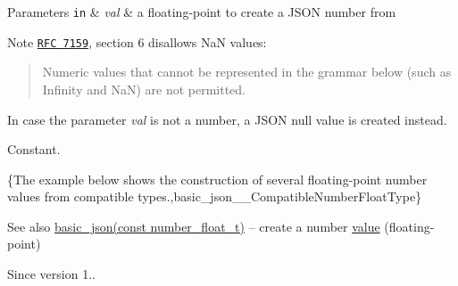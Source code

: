 \begin{DoxyParams}[1]{Parameters}
\mbox{\tt in}  & {\em val} & a floating-\/point to create a J\+S\+ON number from\\
\hline
\end{DoxyParams}
\begin{DoxyNote}{Note}
\href{http://www.rfc-editor.org/rfc/rfc7159.txt}{\tt R\+FC 7159}, section 6 disallows NaN values\+: \begin{quote}
Numeric values that cannot be represented in the grammar below (such as Infinity and NaN) are not permitted. \end{quote}
In case the parameter {\itshape val} is not a number, a J\+S\+ON null value is created instead.
\end{DoxyNote}
Constant.

\{The example below shows the construction of several floating-\/point number values from compatible types.,basic\+\_\+json\+\_\+\+\_\+\+Compatible\+Number\+Float\+Type\}

\begin{DoxySeeAlso}{See also}
\hyperlink{a00025_a2badcf191deabf579abcf8d3654da26f}{basic\+\_\+json(const number\+\_\+float\+\_\+t)} -- create a number \hyperlink{a00025_a0a2cbbd95862a623e7dc5c37e67dead0}{value} (floating-\/point)
\end{DoxySeeAlso}
\begin{DoxySince}{Since}
version 1.. 
\end{DoxySince}
